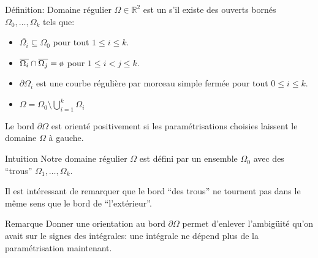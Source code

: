 \documentclass[a4paper]{article}
\begin{document}
\begin{parag}{Définition: Domaine régulier}
    $\Omega \in \mathbb{R}^2$ est un  s'il existe des ouverts bornés $\Omega_0, \ldots, \Omega_k$ tels que:
    \begin{itemize}
        \item $\displaystyle\bar{\Omega_i} \subseteq \Omega_0$ pour tout $1 \leq i \leq k$.
        \item $\displaystyle\bar{\Omega_i} \cap \bar{\Omega_j} = \o$ pour $1 \leq i < j \leq k$.
        \item $\displaystyle\partial \Omega_i$ est une courbe régulière par morceau simple fermée pour tout $0 \leq i \leq k$.
        \item $\displaystyle \Omega = \Omega_0 \setminus \bigcup_{i=1}^k \Omega_i$
    \end{itemize}
    
    Le bord $\partial \Omega$ est orienté positivement si les paramétrisations choisies laissent le domaine $\Omega$ à gauche.

    \begin{subparag}{Intuition}
        Notre domaine régulier $\Omega$ est défini par un ensemble $\Omega_0$ avec des ``trous'' $\Omega_1, \ldots, \Omega_k$.

        Il est intéressant de remarquer que le bord ``des trous'' ne tournent pas dans le même sens que le bord de ``l'extérieur''.
    \end{subparag}

    \begin{subparag}{Remarque}
        Donner une orientation au bord $\partial \Omega$ permet d'enlever l'ambigüité qu'on avait sur le signes des intégrales: une intégrale ne dépend plus de la paramétrisation maintenant.
    \end{subparag}
\end{parag}
\end{document}
